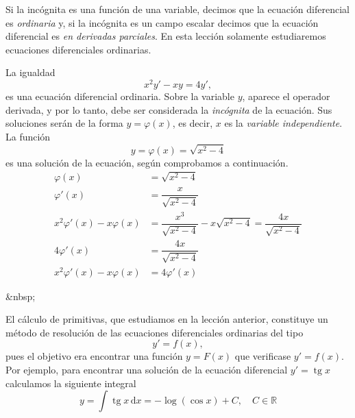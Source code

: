 Si la incógnita es una función de una variable, decimos que la ecuación diferencial es \emph{ordinaria} y, si la incógnita es un campo escalar decimos que la ecuación diferencial es \emph{en derivadas parciales}. En esta lección solamente estudiaremos ecuaciones diferenciales ordinarias.
%
%
\begin{ejemplo}
La igualdad
\[
x^2 y'-xy=4y',
\]
es una ecuación diferencial ordinaria.
Sobre la variable $y$, aparece el operador derivada, y por lo tanto, debe ser considerada la \emph{incógnita} de la ecuación.
Sus soluciones serán de la forma $y=\varphi(x)$, es decir, $x$ es la \emph{variable independiente}.
La función
\[
y=\varphi(x)=\sqrt{x^2-4}
\]
es una solución de la ecuación, según comprobamos a continuación.
\begin{align*}
\varphi(x) &= \sqrt{x^2-4}\\
\varphi'(x) &= \dfrac{x}{\sqrt{x^2-4}}\\
x^2\varphi'(x) -x\varphi(x) &= \dfrac{x^3}{\sqrt{x^2-4}}-x\sqrt{x^2-4} =\dfrac{4x}{\sqrt{x^2-4}}\\
4 \varphi'(x) &=\dfrac{4x}{\sqrt{x^2-4}}\\
x^2\varphi'(x) -x\varphi(x) &= 4 \varphi'(x)\tag*{\fej}
\end{align*}
\end{ejemplo}
\begin{rawhtml}
&nbsp;
\end{rawhtml}
\begin{ejemplo}
El cálculo de primitivas, que estudiamos en la lección anterior, constituye un método de resolución de las ecuaciones diferenciales ordinarias del tipo
$$
y'=f(x),
$$
pues el objetivo era encontrar una función $y=F(x)$ que verificase $y'=f(x)$. Por ejemplo, para encontrar una solución de la ecuación diferencial $y'=\operatorname{tg} x$ calculamos la siguiente integral
\begin{equation}
y=\displaystyle\int\operatorname{tg} x\,\mathrm dx = -\log(\cos x)+C,\quad C\in\mathbb{R}\tag*{\fej}
\end{equation}
\end{ejemplo}

